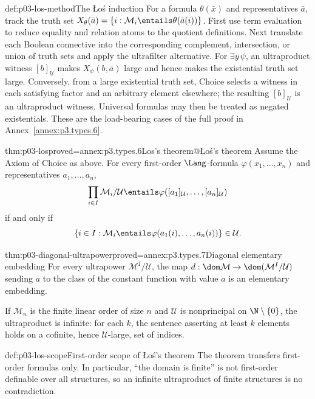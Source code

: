 \begin{hbmethod}{def:p03-los-method}{The \L o\'s induction}
For a formula \(\theta(\bar x)\) and representatives \(\bar a\), track the
truth set
\(X_\theta(\bar a)=\{i:\mathcal M_i\entails\theta(\bar a(i))\}\).
First use term evaluation to reduce equality and relation atoms to the
quotient definitions.  Next translate each Boolean connective into the
corresponding complement, intersection, or union of truth sets and apply the
ultrafilter alternative.  For \(\exists y\,\psi\), an ultraproduct witness
\([b]_{\mathcal U}\) makes \(X_\psi(b,\bar a)\) large and hence makes the
existential truth set large.  Conversely, from a large existential truth set,
Choice selects a witness in each satisfying factor and an arbitrary element
elsewhere; the resulting \([b]_{\mathcal U}\) is an ultraproduct witness.
Universal formulas may then be treated as negated existentials.  These are
the load-bearing cases of the full proof in Annex~\ref{annex:p3.types.6}.
\end{hbmethod}

\begin{hbtheorem}{thm:p03-los}{proved=annex:p3.types.6}{Los's theorem@\L o\'s's theorem}
Assume the Axiom of Choice as above.  For every first-order
\(\Lang\)-formula \(\varphi(x_1,\ldots,x_n)\) and representatives
\(a_1,\ldots,a_n\),
\[
 \prod_{i\in I}\mathcal M_i/\mathcal U
 \entails\varphi([a_1]_{\mathcal U},\ldots,[a_n]_{\mathcal U})
\]
if and only if
\[
 \{i\in I:\mathcal M_i\entails
 \varphi(a_1(i),\ldots,a_n(i))\}\in\mathcal U.
\]
\end{hbtheorem}

\begin{hbcorollary}{thm:p03-diagonal-ultrapower}{proved=annex:p3.types.7}{Diagonal elementary embedding}
For every ultrapower \(\mathcal M^I/\mathcal U\), the map
\(d:\dom\mathcal M\to\dom(\mathcal M^I/\mathcal U)\) sending \(a\) to the
class of the constant function with value \(a\) is an elementary embedding.
\end{hbcorollary}

If \(\mathcal M_n\) is the finite linear order of size \(n\) and
\(\mathcal U\) is nonprincipal on \(\N\setminus\{0\}\), the ultraproduct is
infinite: for each \(k\), the sentence asserting at least \(k\) elements holds
on a cofinite, hence \(\mathcal U\)-large, set of indices.

\begin{hbwarning}{def:p03-los-scope}{First-order scope of \L o\'s's theorem}
The theorem transfers first-order formulas only.  In particular, ``the domain
is finite'' is not first-order definable over all structures, so an infinite
ultraproduct of finite structures is no contradiction.
\end{hbwarning}

